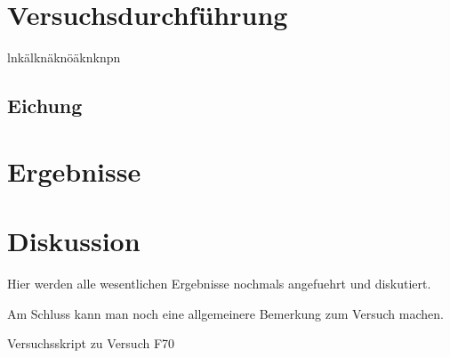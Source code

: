\documentclass[12pt, a4paper]{scrartcl}
\begin{document}
	
	\section{Versuchsdurchführung}
	   lnkälknäknöäknknpn
	
	\subsection{Eichung}
	
	
	\section{Ergebnisse}
	
	
	
	\section{Diskussion}
	
	Hier werden alle wesentlichen Ergebnisse nochmals angefuehrt und diskutiert. 
	
	Am Schluss kann man noch eine allgemeinere Bemerkung zum Versuch machen.
	
	
	\newpage 
	
	\begin{thebibliography}{00}   %
		
		 Versuchsskript zu Versuch F70
		
	\end{thebibliography}
	
\end{document}
